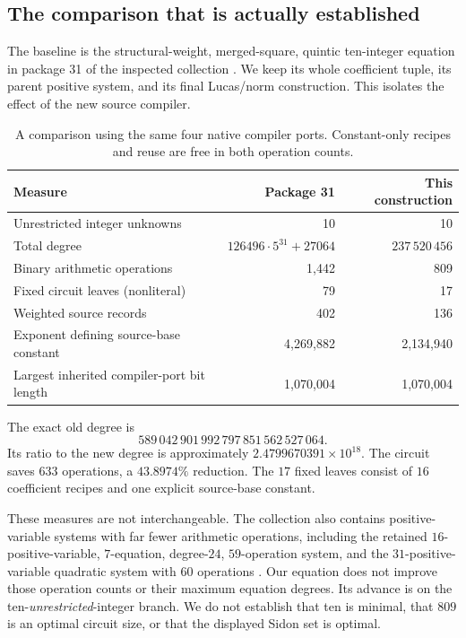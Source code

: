 \documentclass[11pt,a4paper]{article}
\theoremstyle{remark}
\begin{document}
\subsection{The comparison that is actually established}
The baseline is the structural-weight, merged-square, quintic
ten-integer equation in package 31 of the inspected collection
\cite{repo31}. We keep its whole coefficient tuple, its parent positive
system, and its final Lucas/norm construction. This isolates the effect
of the new source compiler.
\begin{table}[ht]
\centering\small
\begin{tabular}{@{}p{58mm}rr@{}}
\toprule
Measure & Package 31 & This construction\\
\midrule
Unrestricted integer unknowns & 10 & 10\\
Total degree & \(126496\cdot5^{31}+27064\) & \(237\,520\,456\)\\
Binary arithmetic operations & 1,442 & 809\\
Fixed circuit leaves (nonliteral) & 79 & 17\\
Weighted source records & 402 & 136\\
Exponent defining source-base constant & 4,269,882 & 2,134,940\\
Largest inherited compiler-port bit length & 1,070,004 & 1,070,004\\
\bottomrule
\end{tabular}
\caption{A comparison using the same four native compiler ports.
Constant-only recipes and reuse are free in both operation counts.}
\label{tab:comparison}
\end{table}
The exact old degree is
\[
589\,042\,901\,992\,797\,851\,562\,527\,064.
\]
Its ratio to the new degree is approximately \(2.4799670391\times10^{18}\).
The circuit saves \(633\) operations, a \(43.8974\%\) reduction.
The \(17\) fixed leaves consist of \(16\) coefficient recipes and one
explicit source-base constant.

These measures are not interchangeable. The collection also contains
positive-variable systems with far fewer arithmetic operations, including
the retained \(16\)-positive-variable, \(7\)-equation, degree-\(24\),
\(59\)-operation system, and the \(31\)-positive-variable quadratic
system with \(60\) operations \cite{repo}. Our equation does not improve
those operation counts or their maximum equation degrees. Its advance is
on the ten-\emph{unrestricted}-integer branch. We do not establish that
ten is minimal, that \(809\) is an optimal circuit size, or that the
displayed Sidon set is optimal.
\end{document}
